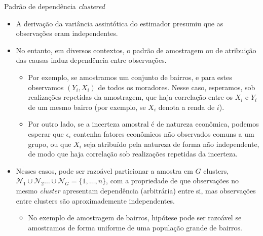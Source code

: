 \documentclass[11pt]{beamer}
\begin{document}
	\begin{frame}{Padrão de dependência \textit{clustered}}
		\begin{itemize}
			\item A derivação da variância assintótica do estimador presumiu que as observações eram independentes.
			\item No entanto, em diversos contextos, {\color{blue}o padrão de amostragem ou de atribuição das causas} induz dependência entre observações.
			\begin{itemize}
				\item Por exemplo, se amostramos um conjunto de bairros, e para estes observamos $(Y_i,X_i)$ de todos os moradores. Nesse caso, esperamos, sob realizações repetidas da amostragem, que haja correlação entre os $X_i$ e $Y_i$ de um mesmo bairro (por exemplo, se $X_i$ denota a renda de $i$).
				\item Por outro lado, se a incerteza amostral é de natureza econômica, podemos esperar que $\epsilon_i$ contenha fatores econômicos não observados comuns a um grupo, ou que $X_i$ seja atribuído pela natureza de forma não independente, de modo que haja correlação sob realizações repetidas da incerteza.
			\end{itemize}
			\item Nesses casos, pode ser razoável particionar a amostra em $G$ {\color{blue}clusters}, $\mathcal{N}_1\cup \mathcal{N}_2 \ldots \cup  \mathcal{N}_G = \{1,\ldots, n\}$, com a propriedade de que observações no mesmo \textit{cluster}  apresentam dependência (arbitrária) entre si, mas observações entre clusters são aproximademente independentes.
			\begin{itemize}
				\item No exemplo de amostragem de bairros, hipótese pode ser razoável se amostramos de forma uniforme de uma população grande de bairros.
			\end{itemize}
		\end{itemize}
	\end{frame}
\end{document}

